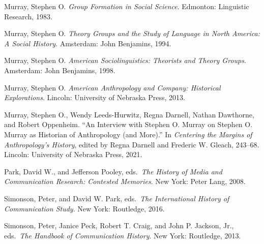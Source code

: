 \documentclass{tufte-handout}
\begin{document}
\begin{hangparas}{.25in}{1}
Murray, Stephen O. \emph{Group Formation in Social Science}. Edmonton:
Linguistic Research, 1983.

Murray, Stephen O. \emph{Theory Groups and the Study of Language in
North America: A Social History}. Amsterdam: John Benjamins, 1994.

Murray, Stephen O. \emph{American Sociolinguistics: Theorists and Theory
Groups}. Amsterdam: John Benjamins, 1998.

Murray, Stephen O. \emph{American Anthropology and Company: Historical
Explorations}. Lincoln: University of Nebraska Press, 2013.

Murray, Stephen O., Wendy Leeds-Hurwitz, Regna Darnell, Nathan
Dawthorne, and Robert Oppenheim. ``An Interview with Stephen O. Murray
on Stephen O. Murray as Historian of Anthropology (and More).'' In
\emph{Centering the Margins of Anthropology's History}, edited by Regna
Darnell and Frederic W. Gleach, 243--68. Lincoln: University of Nebraska
Press, 2021.

Park, David W., and Jefferson Pooley, eds.~\emph{The History of Media
and Communication Research: Contested Memories}. New York: Peter Lang,
2008.

Simonson, Peter, and David W. Park, eds.~\emph{The International History
of Communication Study}. New York: Routledge, 2016.

Simonson, Peter, Janice Peck, Robert T. Craig, and John P. Jackson, Jr.,
eds.~\emph{The Handbook of Communication History}. New York: Routledge,
2013.



\end{hangparas}
\end{document}
